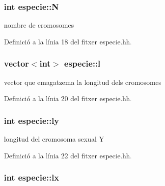 \subsubsection[{\texorpdfstring{N}{N}}]{\setlength{\rightskip}{0pt plus 5cm}int especie\+::N\hspace{0.3cm}{\ttfamily [private]}}\hypertarget{classespecie_a3333db40d4af2c0073d50afea08e0296}{}\label{classespecie_a3333db40d4af2c0073d50afea08e0296}


nombre de cromosomes 



Definició a la línia 18 del fitxer especie.\+hh.

\subsubsection[{\texorpdfstring{l}{l}}]{\setlength{\rightskip}{0pt plus 5cm}vector$<$int$>$ especie\+::l\hspace{0.3cm}{\ttfamily [private]}}\hypertarget{classespecie_a754d7eefb82d1ebe3f573cff16dd43ee}{}\label{classespecie_a754d7eefb82d1ebe3f573cff16dd43ee}


vector que emagatzema la longitud dels cromosomes 



Definició a la línia 20 del fitxer especie.\+hh.

\subsubsection[{\texorpdfstring{ly}{ly}}]{\setlength{\rightskip}{0pt plus 5cm}int especie\+::ly\hspace{0.3cm}{\ttfamily [private]}}\hypertarget{classespecie_ad6993a4730779e367c432cce91780895}{}\label{classespecie_ad6993a4730779e367c432cce91780895}


longitud del cromosoma sexual Y 



Definició a la línia 22 del fitxer especie.\+hh.

\subsubsection[{\texorpdfstring{lx}{lx}}]{\setlength{\rightskip}{0pt plus 5cm}int especie\+::lx\hspace{0.3cm}{\ttfamily [private]}}\hypertarget{classespecie_af620813fbc24dd91e5a25d38b5847bf8}{}\label{classespecie_af620813fbc24dd91e5a25d38b5847bf8}


